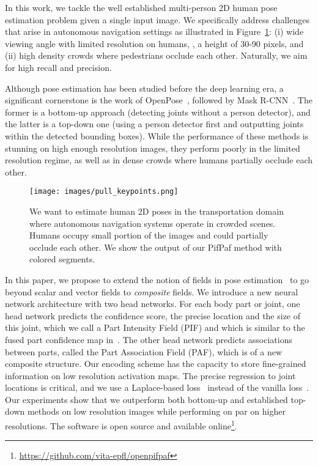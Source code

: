 \documentclass[10pt,twocolumn,letterpaper]{article}
\begin{document}
In this work, we tackle the well established multi-person 2D human pose estimation problem given a single input image. We specifically address challenges that arise in autonomous navigation settings as illustrated in Figure~\ref{fig:pull}:  (i) wide viewing angle with limited resolution on humans, \ie, a height of 30-90 pixels, and (ii) high density crowds where pedestrians occlude each other. Naturally, we aim for high recall and precision.

Although pose estimation has been studied before the deep learning era, a significant cornerstone is the work of OpenPose~\cite{partsaffinityfields}, followed by Mask R-CNN~\cite{he2017mask}. The former is a bottom-up approach (detecting joints without a person detector), and the latter is a top-down one (using a person detector first and outputting joints within the detected bounding boxes). While the performance of these methods is stunning on high enough resolution images, they perform poorly in the limited resolution regime, as well as in dense crowds where humans partially occlude each other.

\begin{figure}
  \centering
  \texttt{[image: images/pull\_keypoints.png]}

  \caption{We want to estimate human 2D poses in the transportation domain where autonomous navigation systems operate in crowded scenes. Humans occupy small portion of the images and could partially occlude each other. We show the output of our PifPaf method with colored segments.}
  \label{fig:pull}
\end{figure}


In this paper, we propose to extend the notion of fields in pose
estimation~\cite{partsaffinityfields} to go beyond scalar and vector fields to \emph{composite}
fields. We introduce a new neural network architecture with two head networks. For each
body part or joint, one head network predicts the confidence score, the precise
location and the size of this joint, which we call a Part Intensity Field (PIF) and
which is similar to the fused part confidence map in~\cite{personlab}. The other head
network predicts associations between parts, called the Part Association Field (PAF),
which is of a new composite structure. Our encoding scheme has the capacity to store
fine-grained information on low resolution activation maps.
The precise regression to joint locations is critical, and we use a Laplace-based  loss~\cite{kendall2017uncertainties} instead of the vanilla  loss~\cite{he2017mask}.
Our experiments show that we outperform both bottom-up and established top-down methods on low resolution images while performing on par on higher resolutions. The software is open source and available
online\footnote{\url{https://github.com/vita-epfl/openpifpaf}}.
\end{document}
